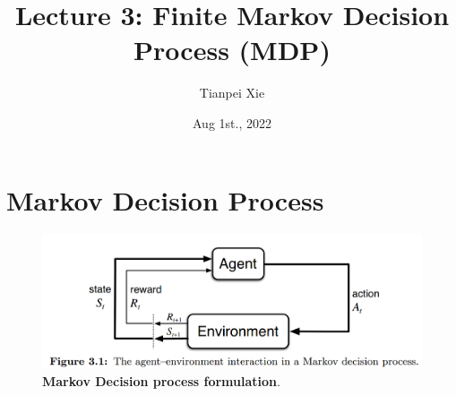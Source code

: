 \documentclass[11pt]{article}
\begin{document}
\title{Lecture 3: Finite Markov Decision Process (MDP)}
\author{Tianpei Xie}
\date{ Aug 1st., 2022 }
\maketitle
\tableofcontents
\newpage
\section{Markov Decision Process}
\begin{figure}
\begin{minipage}[t]{1\linewidth}
  \centering
  \centerline{\includegraphics[scale = 0.3]{mdp.png}}
\end{minipage}
\caption{\footnotesize{\textbf{Markov Decision process formulation}.  \citep{sutton2018reinforcement}}}
\label{fig: mdp}
\end{figure}
\end{document}
